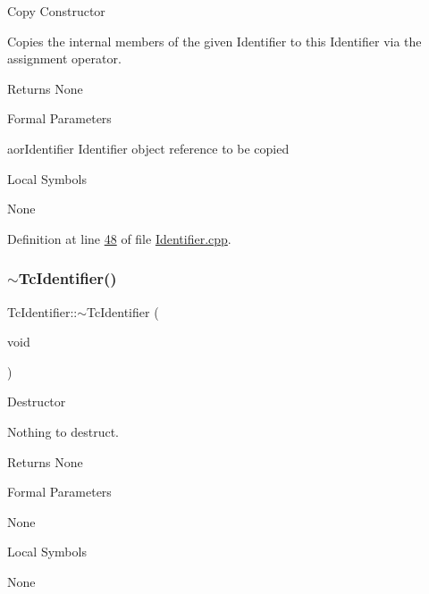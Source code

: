 Copy Constructor

Copies the internal members of the given Identifier to this Identifier via the assignment operator.

\begin{DoxyReturn}{Returns}
None
\end{DoxyReturn}
\begin{DoxyParagraph}{Formal Parameters}

\begin{DoxyPre}{\ttfamily [ in ]  aorIdentifier    Identifier object reference to be copied }\end{DoxyPre}

\end{DoxyParagraph}
\begin{DoxyParagraph}{Local Symbols}

\begin{DoxyPre}{\ttfamily  None }\end{DoxyPre}
 
\end{DoxyParagraph}


Definition at line \mbox{\hyperlink{_identifier_8cpp_source_l00048}{48}} of file \mbox{\hyperlink{_identifier_8cpp_source}{Identifier.\+cpp}}.

\mbox{\label{class_g_n_common_1_1_n_notification_1_1_tc_identifier_a24a949696317f638bc14f2fe76443373}} 
\subsubsection{\texorpdfstring{$\sim$\+Tc\+Identifier()}{~TcIdentifier()}}
{\footnotesize\ttfamily Tc\+Identifier\+::$\sim$\+Tc\+Identifier (\begin{DoxyParamCaption}\item[{void}]{ }\end{DoxyParamCaption})}

Destructor

Nothing to destruct.

\begin{DoxyReturn}{Returns}
None
\end{DoxyReturn}
\begin{DoxyParagraph}{Formal Parameters}

\begin{DoxyPre}{\ttfamily  None }\end{DoxyPre}

\end{DoxyParagraph}
\begin{DoxyParagraph}{Local Symbols}

\begin{DoxyPre}{\ttfamily  None }\end{DoxyPre}
 
\end{DoxyParagraph}


